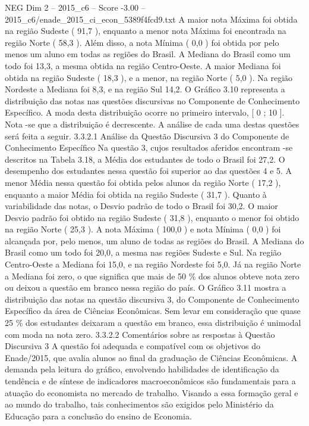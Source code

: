 \begin{textsample}{NEG Dim 2 – 2015\_c6 – Score -3.00 – 2015\_c6/enade\_2015\_ci\_econ\_5389f4fcd9.txt}
A maior nota Máxima foi obtida na região Sudeste ( 91,7 ), enquanto a menor nota Máxima foi encontrada na região Norte ( 58,3 ).
Além disso, a nota Mínima ( 0,0 ) foi obtida por pelo menos um aluno em todas as regiões do Brasil.
A Mediana do Brasil como um todo foi 13,3, a mesma obtida na região Centro-Oeste.
A maior Mediana foi obtida na região Sudeste ( 18,3 ), e a menor, na região Norte ( 5,0 ).
Na região Nordeste a Mediana foi 8,3, e na região Sul 14,2.
O Gráfico 3.10 representa a distribuição das notas nas questões discursivas no Componente de Conhecimento Específico.
A moda desta distribuição ocorre no primeiro intervalo, [ 0 ; 10 ].
Nota -se que a distribuição é decrescente.
A análise de cada uma destas questões será feita a seguir. 3.3.2.1 Análise da Questão Discursiva 3 do Componente de Conhecimento Específico Na questão 3, cujos resultados aferidos encontram -se descritos na Tabela 3.18, a Média dos estudantes de todo o Brasil foi 27,2.
O desempenho dos estudantes nessa questão foi superior ao das questões 4 e 5.
A menor Média nessa questão foi obtida pelos alunos da região Norte ( 17,2 ), enquanto a maior Média foi obtida na região Sudeste ( 31,7 ).
Quanto à variabilidade das notas, o Desvio padrão de todo o Brasil foi 30,2.
O maior Desvio padrão foi obtido na região Sudeste ( 31,8 ), enquanto o menor foi obtido na região Norte ( 25,3 ).
A nota Máxima ( 100,0 ) e nota Mínima ( 0,0 ) foi alcançada por, pelo menos, um aluno de todas as regiões do Brasil.
A Mediana do Brasil como um todo foi 20,0, a mesma nas regiões Sudeste e Sul.
Na região Centro-Oeste a Mediana foi 15,0, e na região Nordeste foi 5,0.
Já na região Norte a Mediana foi zero, o que significa que mais de 50 \% dos alunos obteve nota zero ou deixou a questão em branco nessa região do país.
O Gráfico 3.11 mostra a distribuição das notas na questão discursiva 3, do Componente de Conhecimento Específico da área de Ciências Econômicas.
Sem levar em consideração que quase 25 \% dos estudantes deixaram a questão em branco, essa distribuição é unimodal com moda na nota zero. 3.3.2.2 Comentários sobre as respostas à Questão Discursiva 3 A questão foi adequada e compatível com os objetivos do Enade/2015, que avalia alunos ao final da graduação de Ciências Econômicas.
A demanda pela leitura do gráfico, envolvendo habilidades de identificação da tendência e de síntese de indicadores macroeconômicos são fundamentais para a atuação do economista no mercado de trabalho.
Visando a essa formação geral e ao mundo do trabalho, tais conhecimentos são exigidos pelo Ministério da Educação para a conclusão do ensino de Economia.

\end{textsample}
